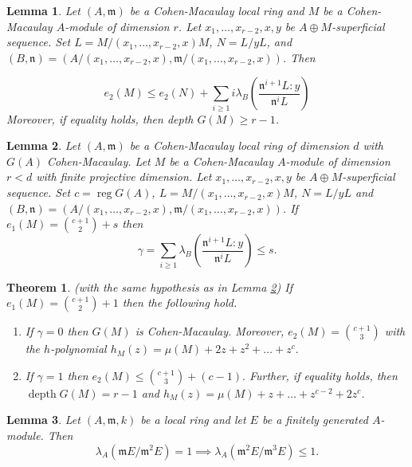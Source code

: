 \documentclass[10pt,a4paper]{amsart}
\newtheorem{lemma}{Lemma}
\newtheorem{theorem}{Theorem}
\newcommand{\depth}{\operatorname{depth}}
\newcommand{\m}{\mathfrak{m}}
\newcommand{\n}{\mathfrak{n}}
\newcommand{\reg}{\operatorname{reg}}
\begin{document}
\begin{lemma}\label{kam}
   Let $(A,\mathfrak{m})$ be a Cohen-Macaulay local ring and $M$ be a Cohen-Macaulay $A$-module of dimension $r$. Let $x_1,\ldots ,x_{r-2},x,y$ be $A\oplus M$-superficial sequence. Set  $L=M/(x_1,\ldots ,x_{r-2},x)M$, $N=L/yL$, and  $(B,\n)=(A/(x_1,\ldots ,x_{r-2},x),\m/(x_1,\ldots ,x_{r-2},x))$. Then
   
   $$e_2(M)\leq e_2(N) + \sum_{i\geq 1}i\lambda_B\left(\frac{{\n}^{i+1}L:y}{{\n}^iL}\right) $$ Moreover, if equality holds, then depth $G(M)\geq r-1$.
\end{lemma}

\begin{lemma}\label{implemma}
     Let $(A,\m)$ be a Cohen-Macaulay local ring of dimension $d$ with $G(A)$ Cohen-Macaulay. Let $M$ be a Cohen-Macaulay $A$-module of dimension $r<d$ with finite projective dimension. Let $x_1,\ldots ,x_{r-2},x,y$ be $A\oplus M$-superficial sequence. Set $c=\reg G(A)$, $L=M/(x_1,\ldots ,x_{r-2},x)M$, $N=L/yL$ and  $(B,\n)=(A/(x_1,\ldots ,x_{r-2},x),\m/(x_1,\ldots ,x_{r-2},x))$. If $e_1(M)=\binom{c+1}{2}+s$ then $$ \gamma=\sum_{i\geq 1} \lambda_B \left(\dfrac{\n^{i+1}L:y}{\n^iL }\right)\leq s.$$
\end{lemma}

\begin{theorem}\label{main+1}
    (with the same hypothesis as in Lemma \ref{implemma}) If $e_1(M)=\binom{c+1}{2}+1$ then the following hold. 
     \begin{enumerate}
         \item \label{1+11} If $\gamma=0$ then $G(M)$ is Cohen-Macaulay. Moreover, $e_2(M)=\binom{c+1}{3}$ with the $h$-polynomial $h_M(z) = \mu(M)+2z+z^2+\ldots+ z^{c}.$
         \item \label{1+12} If $\gamma=1$ then $e_2(M)\leq \binom{c+1}{3}+(c-1).$ Further, if equality holds, then $\depth G(M)= r-1$ and $h_M(z)=\mu(M)+z+\ldots+z^{c-2}+2z^{c}$.
     \end{enumerate} 
\end{theorem}

\begin{lemma}\label{length}
Let $(A,\m,k)$ be a local ring and let $E$ be a finitely generated $A$-module. Then $$\lambda_A({\m E}/{\m^2 E})=1\implies \lambda_A({\m^2 E}/{\m^{3} E})\leq 1.$$
\end{lemma}
\end{document}
